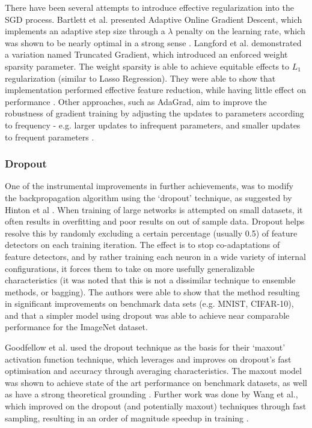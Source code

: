 \documentclass[a4paper,11pt,oneside]{article}
\theoremstyle{plain}
\theoremstyle{definition}
\begin{document}
There have been several attempts to introduce effective regularization into the SGD process. Bartlett et al. 
presented Adaptive Online Gradient Descent, which implements an adaptive step size through a $\lambda$ 
penalty on the learning rate, which was shown to be nearly optimal in a strong sense \cite{Bartlett}. Langford et al. 
demonstrated a variation named Truncated Gradient, which introduced an enforced weight sparsity parameter. 
The weight sparsity is able to achieve equitable effects to $L_1$ regularization (similar to Lasso Regression). 
They were able to show that implementation performed effective feature reduction, while having little effect on 
performance \cite{Langford}. Other approaches, such as AdaGrad, aim to improve the robustness of gradient training by 
adjusting the updates to parameters according to frequency - e.g. larger updates to infrequent parameters, and 
smaller updates to frequent parameters \cite{Duchi, Zeiler}. 
\hfill\break

\subsubsection{Dropout}

One of the instrumental improvements in further achievements, was to modify the backpropagation 
algorithm using the ‘dropout’ technique, as suggested by Hinton et al \cite{Hinton4}. When training of large networks is 
attempted on small datasets, it often results in overfitting and poor results on out of sample data. Dropout helps 
resolve this by randomly excluding a certain percentage (usually 0.5) of feature detectors on each training iteration. 
The effect is to stop co-adaptations of feature detectors, and by rather training each neuron in a wide variety of 
internal configurations, it forces them to take on more usefully generalizable characteristics (it was noted that this
is not a dissimilar technique to ensemble methods, or bagging). The authors were able to show that the method
resulting in significant improvements on benchmark data sets (e.g. MNIST, CIFAR-10), and that a simpler model 
using dropout was able to achieve near comparable performance for the ImageNet dataset.
\hfill \break 

Goodfellow et al. used the dropout technique as the basis for their ‘maxout’ activation function technique, which 
leverages and improves on dropout’s fast optimisation and accuracy through averaging characteristics. The 
maxout model was shown to achieve state of the art performance on benchmark datasets, as well as have a 
strong theoretical grounding \cite{Goodfellow}. Further work was done by Wang et al., which improved on the dropout 
(and potentially maxout) techniques through fast sampling, resulting in an order of magnitude speedup in
training \cite{Wang2}.
\hfill \break 
\end{document}
